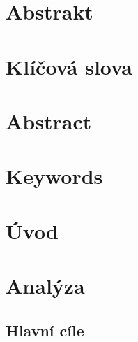 \documentclass[a4paper,11pt,titlepage,fleqn]{article}
\begin{document}


\setcounter{page}{3}

\newpage
\thispagestyle{plain}
\section*{Abstrakt}

\section*{Klíčová slova}

\thispagestyle{empty}
\newpage

\section*{Abstract}

\section*{Keywords}

\thispagestyle{empty}

\newpage
\setcounter{tocdepth}{2}
\tableofcontents

\newpage
\listoffigures
\listoftables
\lstlistoflistings

\newpage
\printglossary[type=\acronymtype,title=Seznam zkratek]
\cleardoublepage


\section{Úvod}


\newpage
\section{Analýza}

    \subsection{Hlavní cíle}
        
\end{document}

